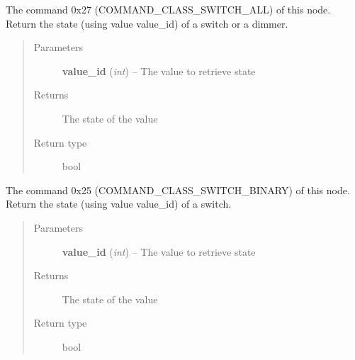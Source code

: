 \documentclass[letterpaper,10pt,english]{sphinxmanual}
\begin{document}
\begin{fulllineitems}

\begin{fulllineitems}
\label{command:openzwave.command.ZWaveNodeSwitch.get_switch_all_state}
The command 0x27 (COMMAND\_CLASS\_SWITCH\_ALL) of this node.
Return the state (using value value\_id) of a switch or a dimmer.
\begin{quote}\begin{description}
\item[{Parameters}] \leavevmode
\textbf{value\_id} (\emph{int}) -- The value to retrieve state

\item[{Returns}] \leavevmode
The state of the value

\item[{Return type}] \leavevmode
bool

\end{description}\end{quote}

\end{fulllineitems}


\begin{fulllineitems}
\label{command:openzwave.command.ZWaveNodeSwitch.get_switch_state}
The command 0x25 (COMMAND\_CLASS\_SWITCH\_BINARY) of this node.
Return the state (using value value\_id) of a switch.
\begin{quote}\begin{description}
\item[{Parameters}] \leavevmode
\textbf{value\_id} (\emph{int}) -- The value to retrieve state

\item[{Returns}] \leavevmode
The state of the value

\item[{Return type}] \leavevmode
bool

\end{description}\end{quote}

\end{fulllineitems}



\end{fulllineitems}
\end{document}
